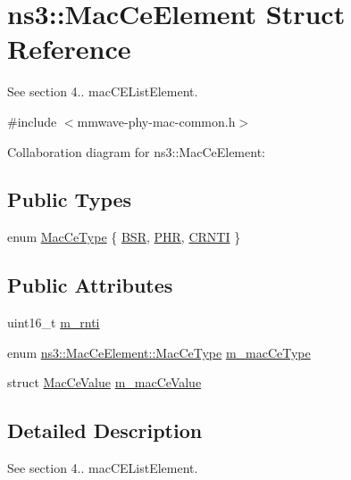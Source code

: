 \hypertarget{structns3_1_1MacCeElement}{}\section{ns3\+:\+:Mac\+Ce\+Element Struct Reference}
\label{structns3_1_1MacCeElement}


See section 4.. mac\+C\+E\+List\+Element.  




{\ttfamily \#include $<$mmwave-\/phy-\/mac-\/common.\+h$>$}



Collaboration diagram for ns3\+:\+:Mac\+Ce\+Element\+:
\subsection*{Public Types}
\begin{DoxyCompactItemize}
\item 
enum \hyperlink{structns3_1_1MacCeElement_a7b68183e7a7fd9b02783f92a2c645d7b}{Mac\+Ce\+Type} \{ \hyperlink{structns3_1_1MacCeElement_a7b68183e7a7fd9b02783f92a2c645d7ba459101d6c51f15c22bfdf75d68f9c631}{B\+SR}, 
\hyperlink{structns3_1_1MacCeElement_a7b68183e7a7fd9b02783f92a2c645d7bad5622f6162ad5e78ccbc90cb99553304}{P\+HR}, 
\hyperlink{structns3_1_1MacCeElement_a7b68183e7a7fd9b02783f92a2c645d7ba232e7c042d35db8641cb419d82d8a951}{C\+R\+N\+TI}
 \}
\end{DoxyCompactItemize}
\subsection*{Public Attributes}
\begin{DoxyCompactItemize}
\item 
uint16\+\_\+t \hyperlink{structns3_1_1MacCeElement_a4f41de3b3f876ecd90a60b31d4cd43c3}{m\+\_\+rnti}
\item 
enum \hyperlink{structns3_1_1MacCeElement_a7b68183e7a7fd9b02783f92a2c645d7b}{ns3\+::\+Mac\+Ce\+Element\+::\+Mac\+Ce\+Type} \hyperlink{structns3_1_1MacCeElement_a92091162005bd551450d753b44a8424f}{m\+\_\+mac\+Ce\+Type}
\item 
struct \hyperlink{structns3_1_1MacCeValue}{Mac\+Ce\+Value} \hyperlink{structns3_1_1MacCeElement_a44b4cdfd792ab8ead4100ad6ca587143}{m\+\_\+mac\+Ce\+Value}
\end{DoxyCompactItemize}


\subsection{Detailed Description}
See section 4.. mac\+C\+E\+List\+Element. 

